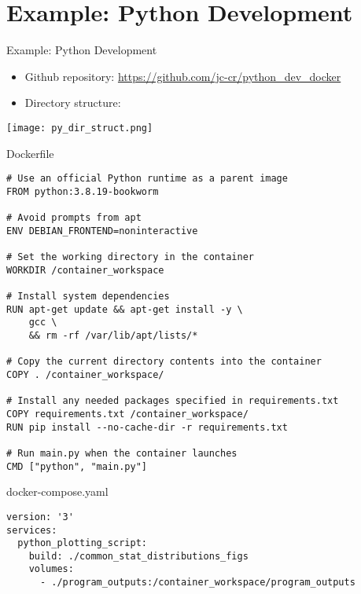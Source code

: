 \documentclass{beamer}
\begin{document}
\section{Example: Python Development}

\begin{frame}[fragile]{Example: Python Development}

    \vspace{-20pt}
    \begin{itemize}
        \item Github repository: \href{https://github.com/jc-cr/python_dev_docker}{https:\slash\slash github.com\slash jc-cr\slash python\_dev\_docker}
        \item Directory structure:
    \end{itemize}
    \texttt{[image: py\_dir\_struct.png]}
\end{frame}

\begin{frame}[fragile]{Dockerfile}
            \begin{lstlisting}[style=docker]
# Use an official Python runtime as a parent image
FROM python:3.8.19-bookworm

# Avoid prompts from apt
ENV DEBIAN_FRONTEND=noninteractive

# Set the working directory in the container
WORKDIR /container_workspace

# Install system dependencies
RUN apt-get update && apt-get install -y \
    gcc \
    && rm -rf /var/lib/apt/lists/*

# Copy the current directory contents into the container
COPY . /container_workspace/

# Install any needed packages specified in requirements.txt
COPY requirements.txt /container_workspace/
RUN pip install --no-cache-dir -r requirements.txt

# Run main.py when the container launches
CMD ["python", "main.py"]
            \end{lstlisting}
\end{frame}

\begin{frame}[fragile]{docker-compose.yaml}
            \begin{lstlisting}[style=yaml]
version: '3'
services:
  python_plotting_script:
    build: ./common_stat_distributions_figs
    volumes:
      - ./program_outputs:/container_workspace/program_outputs
            \end{lstlisting}
\end{frame}
\end{document}
